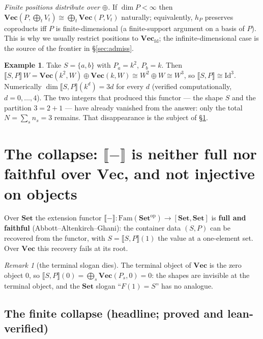 \documentclass[11pt]{article}
\theoremstyle{plain}
\theoremstyle{definition}
\newtheorem{example}{Example}
\theoremstyle{remark}
\newtheorem{remark}{Remark}
\newcommand{\Set}{\mathbf{Set}}
\newcommand{\Vect}{\mathbf{Vec}}
\newcommand{\Vecfd}{\mathbf{Vec}_{\mathrm{fd}}}
\newcommand{\Fam}{\mathrm{Fam}}
\newcommand{\ext}[1]{\llbracket #1 \rrbracket}
\newcommand{\op}{\mathrm{op}}
\DeclareMathOperator{\dm}{dim}
\begin{document}
\emph{Finite positions distribute over $\oplus$.} If $\dm P<\infty$ then
$\Vect(P,\bigoplus_t V_t)\cong\bigoplus_t\Vect(P,V_t)$ naturally; equivalently, $h_P$ preserves
coproducts iff $P$ is finite-dimensional (a finite-support argument on a basis of $P$). This is why
we usually restrict positions to $\Vecfd$; the infinite-dimensional case is the source of the
frontier in \S\ref{sec:admiss}.

\begin{example}
\label{ex:small}
Take $S=\{a,b\}$ with $P_a=k^2$, $P_b=k$. Then
$\ext{S,P}\,W=\Vect(k^2,W)\oplus\Vect(k,W)\cong W^2\oplus W\cong W^3$, so
$\ext{S,P}\cong\mathrm{Id}^3$. Numerically $\dm\ext{S,P}(k^d)=3d$ for every $d$
(verified computationally, $d=0,\dots,4$). The two integers that produced this functor --- the
shape $S$ and the partition $3=2+1$ --- have already vanished from the answer: only the total
$N=\sum_s n_s=3$ remains. That disappearance is the subject of \S\ref{sec:collapse}.
\end{example}

\section{The collapse: $\ext{-}$ is neither full nor faithful over $\Vect$, and not injective on objects}
\label{sec:collapse}

Over $\Set$ the extension functor $\ext{-}\colon\Fam(\Set^\op)\to[\Set,\Set]$ is \textbf{full and
faithful} (Abbott--Altenkirch--Ghani): the container data $(S,P)$ can be recovered from the functor,
with $S=\ext{S,P}(1)$ the value at a one-element set. Over $\Vect$ this recovery fails at its root.

\begin{remark}[the terminal slogan dies]
The terminal object of $\Vect$ is the zero object $0$, so
$\ext{S,P}(0)=\bigoplus_s\Vect(P_s,0)=0$: the shapes are invisible at the terminal object, and the
$\Set$ slogan ``$F(1)=S$'' has no analogue.
\end{remark}

\subsection{The finite collapse (headline; proved and lean-verified)}
\end{document}
